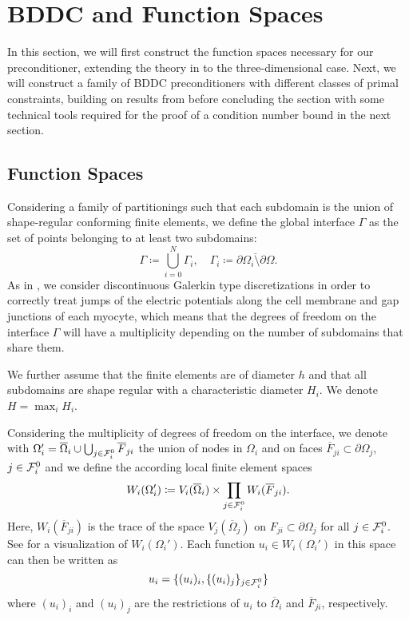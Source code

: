 \section{BDDC and Function Spaces} \label{spaces}

In this section, we will first construct the function spaces necessary for our preconditioner, extending the theory in \cite{2D-proof} to the three-dimensional case. Next, we will construct a family of BDDC preconditioners with different classes of primal constraints, building on results from \cite{sarkis-2D, sarkis-2D-deluxe, sarkis-3D,2D-proof} before concluding the section with some technical tools required for the proof of a condition number bound in the next section.

\subsection{Function Spaces}
\label{sec:spaces}
Considering a family of partitionings such that each subdomain is the union of shape-regular conforming finite elements, we define the global interface $\Gamma$ as the set of points belonging to at least two subdomains:
\[\Gamma \coloneqq \bigcup_{i = 0}^N \Gamma_i, \quad \Gamma_i \coloneqq \overline{\partial\Omega_i\setminus\partial\Omega}.\]
As in \cite{2D-proof}, we consider discontinuous Galerkin type discretizations in order to correctly treat jumps of the electric potentials along the cell membrane and gap junctions of each myocyte, which means that the degrees of freedom on the interface $\Gamma$ will have a multiplicity depending on the number of subdomains that share them.

We further assume that the finite elements are of diameter $h$ and that all subdomains are shape regular with a characteristic diameter $H_i$. We denote $H = \max_i H_i$.

Considering the multiplicity of degrees of freedom on the interface, we denote with $\Omega_i' = \overline{\Omega}_i \cup \bigcup_{j \in \mathcal{F}_i^0} \overline{F}_{ji}$ the union of nodes in $\Omega_i$ and on faces $\overline{F}_{ji} \subset \partial \Omega_j$, $j \in \mathcal{F}_i^0$ and we define the according local finite element spaces
\[W_i(\Omega_i') \coloneqq V_i(\overline{\Omega}_i) \times \prod_{j \in \mathcal{F}_i^0} W_i(\overline{F}_{ji}).\]
Here, $W_i(\overline{F}_{ji})$ is the trace of the space $V_j(\overline{\Omega}_j)$ on $F_{ji} \subset \partial \Omega_j$ for all $j \in \mathcal{F}_i^0$. See  for a visualization of $W_i(\Omega_i')$. Each function $u_i \in W_i(\Omega_i')$ in this space can then be written as 
\begin{equation}
    u_i = \{(u_i)_i, \{(u_i)_j\}_{j \in \mathcal{F}_i^0} \}
    \label{u_1}
\end{equation}
where $(u_i)_i$ and $(u_i)_j$ are the restrictions of $u_i$ to $\overline{\Omega}_i$ and $\overline{F}_{ji}$, respectively.

